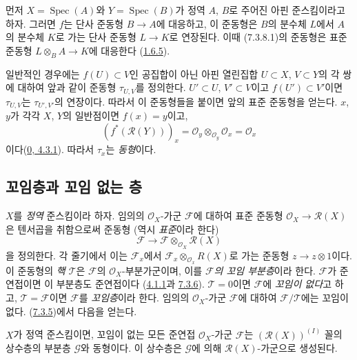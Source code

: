 먼저 $X=\operatorname{Spec}(A)$와 $Y=\operatorname{Spec}(B)$가
정역 $A$, $B$로 주어진 아핀 준스킴이라고 하자. 그러면 $f$는
단사 준동형 $B\to A$에 대응하고, 이 준동형은 $B$의 분수체
$L$에서 $A$의 분수체 $K$로 가는 단사 준동형 $L\to K$로
연장된다. 이때 (7.3.8.1)의 준동형은 표준 준동형
$L\otimes_B A\to K$에 대응한다
(\hyperref[I.1.6.5-ko]{1.6.5}).

일반적인 경우에는 $f(U)\subset V$인 공집합이 아닌 아핀
열린집합 $U\subset X$, $V\subset Y$의 각 쌍에 대하여 앞과 같이
준동형 $\tau_{U,V}$를 정의한다. $U'\subset U$, $V'\subset V$이고
$f(U')\subset V'$이면 $\tau_{U,V}$는 $\tau_{U',V'}$의 연장이다.
따라서 이 준동형들을 붙이면 앞의 표준
준동형을 얻는다. $x$, $y$가 각각 $X$, $Y$의 일반점이면
$f(x)=y$이고,
\[
  (f^*(\mathscr{R}(Y)))_x
  =\mathscr{O}_y\otimes_{\mathscr{O}_y}\mathscr{O}_x
  =\mathscr{O}_x
\]
이다(\hyperref[0.4.3.1-ko]{0, 4.3.1}). 따라서 $\tau_x$는
\emph{동형}이다.

\subsection{꼬임층과 꼬임 없는 층}
\label{subsection:I.7.4-ko}

\begin{env}[7.4.1]
\label{I.7.4.1-ko}
$X$를 \emph{정역} 준스킴이라 하자. 임의의 $\mathscr{O}_X$-가군
$\mathscr{F}$에 대하여 표준 준동형
$\mathscr{O}_X\to\mathscr{R}(X)$은 텐서곱을 취함으로써 준동형
(역시 \emph{표준}이라 한다)
\[
  \mathscr{F}\to
  \mathscr{F}\otimes_{\mathscr{O}_X}\mathscr{R}(X)
\]
을 정의한다. 각 줄기에서 이는 $\mathscr{F}_x$에서
$\mathscr{F}_x\otimes_{\mathscr{O}_x}R(X)$로 가는 준동형
$z\to z\otimes 1$이다. 이 준동형의 \emph{핵 $\mathscr{T}$}은
$\mathscr{F}$의 $\mathscr{O}_X$-부분가군이며, 이를
\emph{$\mathscr{F}$의 꼬임 부분층}이라 한다. $\mathscr{F}$가
준연접이면 이 부분층도 준연접이다
(\hyperref[I.4.1.1-ko]{4.1.1}과
\hyperref[I.7.3.6-ko]{7.3.6}). $\mathscr{T}=0$이면
$\mathscr{F}$에 \emph{꼬임이 없다}고 하고,
$\mathscr{T}=\mathscr{F}$이면 $\mathscr{F}$를 \emph{꼬임층}이라 한다.
임의의 $\mathscr{O}_X$-가군 $\mathscr{F}$에 대하여
$\mathscr{F}/\mathscr{T}$에는 꼬임이 없다.
(\hyperref[I.7.3.5-ko]{7.3.5})에서 다음을 얻는다.
\end{env}

\begin{proposition}[7.4.2]
\label{I.7.4.2-ko}
$X$가 정역 준스킴이면, 꼬임이 없는 모든 준연접
$\mathscr{O}_X$-가군 $\mathscr{F}$는 $(\mathscr{R}(X))^{(I)}$ 꼴의
상수층의 부분층 $\mathscr{G}$와 동형이다. 이 상수층은
$\mathscr{G}$에 의해 $\mathscr{R}(X)$-가군으로 생성된다.
\end{proposition}


